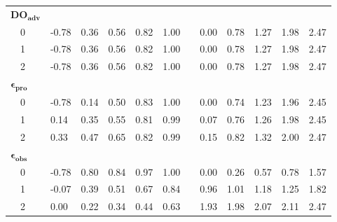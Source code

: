 \documentclass[letterpaper,12pt,oneside]{article}\usepackage[]{graphicx}\usepackage[]{color}
\begin{document}
\begin{table}[h]
\begin{center}
\begin{tabular}{llllllclllll}
\hline
{\bfseries $\boldsymbol{DO_{adv}}$}&&&&&&&&&&&\tabularnewline
~~0&-0.78&0.36&0.56&0.82&1.00&&0.00&0.78&1.27&1.98&2.47\tabularnewline
~~1&-0.78&0.36&0.56&0.82&1.00&&0.00&0.78&1.27&1.98&2.47\tabularnewline
~~2&-0.78&0.36&0.56&0.82&1.00&&0.00&0.78&1.27&1.98&2.47\tabularnewline
\hline
{\bfseries $\boldsymbol{\epsilon_{pro}}$}&&&&&&&&&&&\tabularnewline
~~0&-0.78&0.14&0.50&0.83&1.00&&0.00&0.74&1.23&1.96&2.45\tabularnewline
~~1& 0.14&0.35&0.55&0.81&0.99&&0.07&0.76&1.26&1.98&2.45\tabularnewline
~~2& 0.33&0.47&0.65&0.82&0.99&&0.15&0.82&1.32&2.00&2.47\tabularnewline
\hline
{\bfseries $\boldsymbol{\epsilon_{obs}}$}&&&&&&&&&&&\tabularnewline
~~0&-0.78&0.80&0.84&0.97&1.00&&0.00&0.26&0.57&0.78&1.57\tabularnewline
~~1&-0.07&0.39&0.51&0.67&0.84&&0.96&1.01&1.18&1.25&1.82\tabularnewline
~~2& 0.00&0.22&0.34&0.44&0.63&&1.93&1.98&2.07&2.11&2.47\tabularnewline
\hline
\end{tabular}
\end{center}
\end{table}
\end{document}
